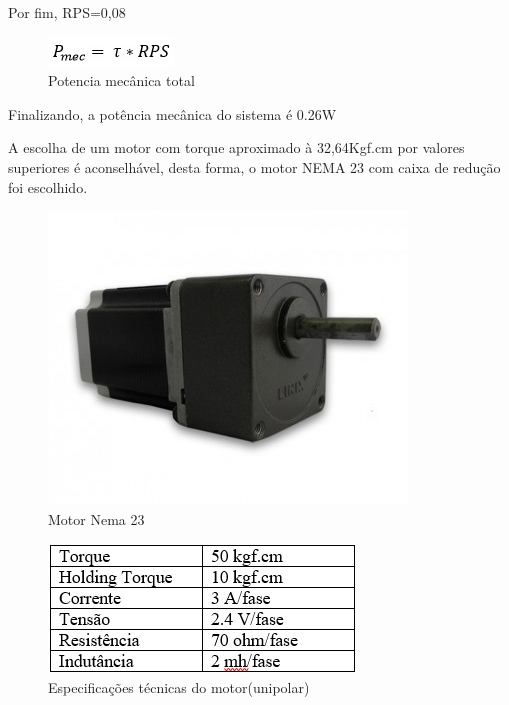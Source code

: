 Por fim, RPS=0,08


\begin{figure}[!h]
\centering
\includegraphics[scale=0.8, angle = 360]{figuras/formula7}
\caption[]{Potencia mecânica total}
\end{figure}
\FloatBarrier

Finalizando, a potência mecânica do sistema é 0.26W

A escolha de um motor com torque aproximado à 
32,64Kgf.cm por valores superiores é aconselhável, desta forma, o motor NEMA 23 com caixa de redução foi escolhido.

\begin{figure}[!h]
\centering
\includegraphics[scale=0.8, angle = 360]{figuras/Motor}
\caption[]{Motor Nema 23}
\end{figure}
\FloatBarrier

\begin{figure}[!h]
\centering
\includegraphics[scale=0.8, angle = 360]{figuras/tabela_unipolar}
\caption[]{Especificações técnicas do motor(unipolar)}
\end{figure}
\FloatBarrier

